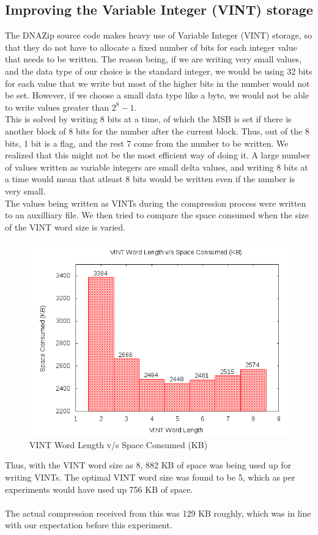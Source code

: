 \documentclass{article}
\begin{document}
\clearpage

\subsection {Improving the Variable Integer (VINT) storage}
The DNAZip source code makes heavy use of Variable Integer (VINT) storage, so that they do not have to allocate a fixed
number of bits for each integer value that needs to be written. The reason being, if we are writing very small values, and the data type of our choice is the standard integer, we would be using 32 bits for each value that we write but most of the higher bits in the number would not be set. However, if we choose a small data type like a byte, we would not be able to write values greater than $2^8 - 1$. \\
This is solved by writing 8 bits at a time, of which the MSB is set if there is another block of 8 bits for the number after the current block. Thus, out of the 8 bits, 1 bit is a flag, and the rest 7 come from the number to be written. We realized that this might not be the most efficient way of doing it. A large number of values written as variable integers are small delta values, and writing 8 bits at a time would mean that atleast 8 bits would be written even if the number is very small. \\
The values being written as VINTs during the compression process were written to an auxilliary file. We then tried to compare the space consumed when the size of the VINT word size is varied. 

\begin{figure}[htp]
\centering
\includegraphics[scale=0.4]{images/VINT.png}
\caption{VINT Word Length v/s Space Consumed (KB)}\label{fig:fs}
\end{figure}
\clearpage
Thus, with the VINT word size as 8, 882 KB of space was being used up for writing VINTs. The optimal VINT word size was found to be 5, which as per experiments would have used up 756 KB of space.\\
\\ 
The actual compression received from this was 129 KB roughly, which was in line with our expectation before this experiment.\\
\clearpage
\end{document}
